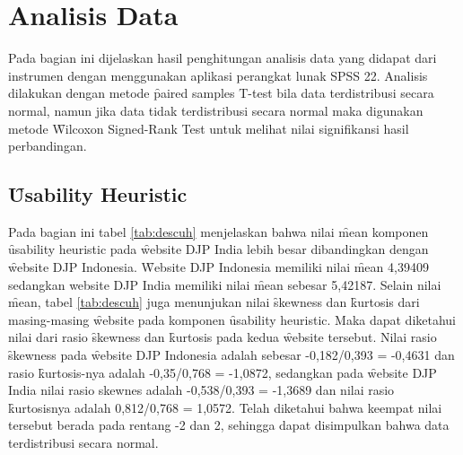 \section{Analisis Data}
Pada bagian ini dijelaskan hasil penghitungan analisis data yang didapat dari instrumen dengan menggunakan aplikasi perangkat lunak SPSS 22. Analisis dilakukan dengan metode \f{paired samples T-test} bila data terdistribusi secara normal, namun jika data tidak terdistribusi secara normal maka digunakan metode \f{Wilcoxon Signed-Rank Test} untuk melihat nilai signifikansi hasil perbandingan.
\subsection{\f{Usability Heuristic}}
Pada bagian ini tabel \ref{tab:descuh} menjelaskan bahwa nilai \f{mean} komponen \f{usability heuristic} pada \f{website} DJP India lebih besar dibandingkan dengan \f{website} DJP Indonesia. \f{Website} DJP Indonesia memiliki nilai \f{mean} 4,39409 sedangkan website DJP India memiliki nilai \f{mean} sebesar 5,42187. Selain nilai \f{mean}, tabel \ref{tab:descuh} juga menunjukan nilai \f{skewness} dan \f{kurtosis} dari masing-masing \f{website} pada komponen \f{usability heuristic}. Maka dapat diketahui nilai dari rasio \f{skewness} dan \f{kurtosis} pada kedua \f{website} tersebut. Nilai rasio \f{skewness} pada \f{website} DJP Indonesia adalah sebesar -0,182/0,393 = -0,4631 dan rasio \f{kurtosis}-nya adalah -0,35/0,768 = -1,0872, sedangkan pada \f{website} DJP India nilai rasio skewnes adalah -0,538/0,393 = -1,3689 dan nilai rasio \f{kurtosis}nya adalah 0,812/0,768 = 1,0572. Telah diketahui bahwa keempat nilai tersebut berada pada rentang -2 dan 2, sehingga dapat disimpulkan bahwa data terdistribusi secara normal. 
